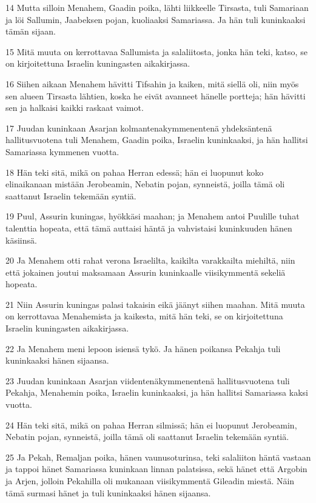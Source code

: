 \par 14 Mutta silloin Menahem, Gaadin poika, lähti liikkeelle Tirsasta, tuli Samariaan ja löi Sallumin, Jaabeksen pojan, kuoliaaksi Samariassa. Ja hän tuli kuninkaaksi tämän sijaan.
\par 15 Mitä muuta on kerrottavaa Sallumista ja salaliitosta, jonka hän teki, katso, se on kirjoitettuna Israelin kuningasten aikakirjassa.
\par 16 Siihen aikaan Menahem hävitti Tifsahin ja kaiken, mitä siellä oli, niin myös sen alueen Tirsasta lähtien, koska he eivät avanneet hänelle portteja; hän hävitti sen ja halkaisi kaikki raskaat vaimot.
\par 17 Juudan kuninkaan Asarjan kolmantenakymmenentenä yhdeksäntenä hallitusvuotena tuli Menahem, Gaadin poika, Israelin kuninkaaksi, ja hän hallitsi Samariassa kymmenen vuotta.
\par 18 Hän teki sitä, mikä on pahaa Herran edessä; hän ei luopunut koko elinaikanaan mistään Jerobeamin, Nebatin pojan, synneistä, joilla tämä oli saattanut Israelin tekemään syntiä.
\par 19 Puul, Assurin kuningas, hyökkäsi maahan; ja Menahem antoi Puulille tuhat talenttia hopeata, että tämä auttaisi häntä ja vahvistaisi kuninkuuden hänen käsiinsä.
\par 20 Ja Menahem otti rahat verona Israelilta, kaikilta varakkailta miehiltä, niin että jokainen joutui maksamaan Assurin kuninkaalle viisikymmentä sekeliä hopeata.
\par 21 Niin Assurin kuningas palasi takaisin eikä jäänyt siihen maahan. Mitä muuta on kerrottavaa Menahemista ja kaikesta, mitä hän teki, se on kirjoitettuna Israelin kuningasten aikakirjassa.
\par 22 Ja Menahem meni lepoon isiensä tykö. Ja hänen poikansa Pekahja tuli kuninkaaksi hänen sijaansa.
\par 23 Juudan kuninkaan Asarjan viidentenäkymmenentenä hallitusvuotena tuli Pekahja, Menahemin poika, Israelin kuninkaaksi, ja hän hallitsi Samariassa kaksi vuotta.
\par 24 Hän teki sitä, mikä on pahaa Herran silmissä; hän ei luopunut Jerobeamin, Nebatin pojan, synneistä, joilla tämä oli saattanut Israelin tekemään syntiä.
\par 25 Ja Pekah, Remaljan poika, hänen vaunusoturinsa, teki salaliiton häntä vastaan ja tappoi hänet Samariassa kuninkaan linnan palatsissa, sekä hänet että Argobin ja Arjen, jolloin Pekahilla oli mukanaan viisikymmentä Gileadin miestä. Näin tämä surmasi hänet ja tuli kuninkaaksi hänen sijaansa.
